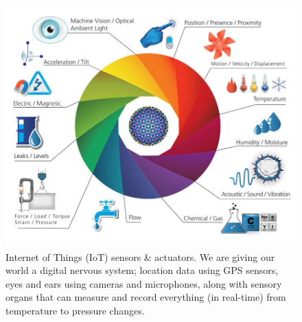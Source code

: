     \begin{tcolorbox}
    [enhanced,
    title=Global nervous system,
    frame style=
    {left color=orange!85!black,right color=yellow!95!black}]
        
                \textit{}
               
\end{tcolorbox}
\medskip

    
    
    \begin{figure}[hb]
    \centering
    \includegraphics[width=\textwidth]{img/ch-revolution/IOTsensors.jpg}
    \caption[Internet of Things (IoT) sensors \& actuators]{Internet of Things (IoT) sensors \& actuators. We are giving our world a digital nervous system; location data using GPS sensors, eyes and ears using cameras and microphones, along with sensory organs that can measure and record everything (in real-time) from temperature to pressure changes.}
    \label{fig:IOTsensors.jpg}
    \end{figure}
    
